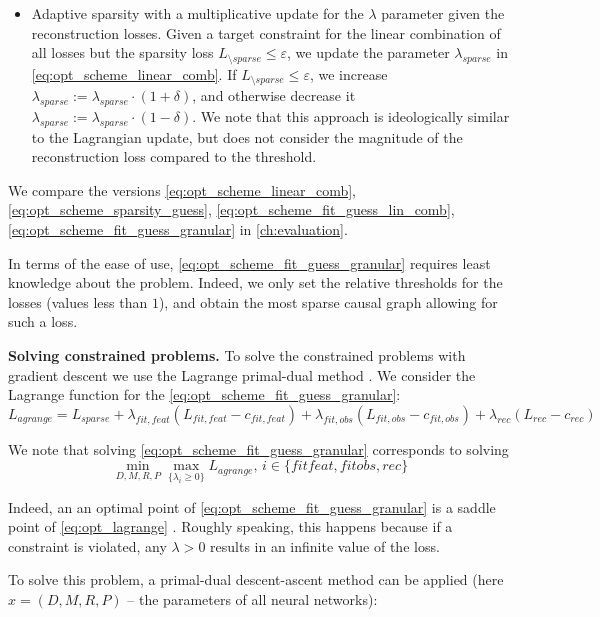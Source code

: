 \documentclass[a4paper,11pt,oneside]{report}
\begin{document}
\begin{itemize}
    \item Adaptive sparsity \cite{Dieleman2021} with a multiplicative update for the $\lambda$ parameter given the reconstruction losses. Given a target constraint for the linear combination of all losses but the sparsity loss $L_{\setminus sparse}\leq\varepsilon$, we update the parameter $\lambda_{sparse}$ in \autoref{eq:opt_scheme_linear_comb}. If $L_{\setminus sparse}\leq\varepsilon$, we increase $\lambda_{sparse}:=\lambda_{sparse}\cdot (1+\delta)$, and otherwise decrease it $\lambda_{sparse}:=\lambda_{sparse}\cdot (1-\delta)$. We note that this approach is ideologically similar to the Lagrangian update, but does not consider the magnitude of the reconstruction loss compared to the threshold.
\end{itemize}

We compare the versions \ref{eq:opt_scheme_linear_comb}, \ref{eq:opt_scheme_sparsity_guess}, \ref{eq:opt_scheme_fit_guess_lin_comb}, \ref{eq:opt_scheme_fit_guess_granular} in \autoref{ch:evaluation}.

In terms of the ease of use, \autoref{eq:opt_scheme_fit_guess_granular} requires least knowledge about the problem. Indeed, we only set the relative thresholds for the losses (values less than $1$), and obtain the most sparse causal graph allowing for such a loss.

{\bf Solving constrained problems.} To solve the constrained problems with gradient descent we use the Lagrange primal-dual method \cite{Adegbege2021}. We consider the Lagrange function for the \autoref{eq:opt_scheme_fit_guess_granular}:
$$
L_{agrange}=L_{sparse}+\lambda_{fit, feat}(L_{fit, feat}-c_{fit, feat})+\lambda_{fit, obs}(L_{fit, obs}-c_{fit, obs})+\lambda_{rec}(L_{rec}-c_{rec})
$$

We note that solving \autoref{eq:opt_scheme_fit_guess_granular} corresponds to solving
\begin{equation}
\label{eq:opt_lagrange}
\min\limits_{D,M,R,P}\max\limits_{\{\lambda_i\geq 0\}}L_{agrange},\,i\in\{fitfeat, fitobs, rec\}
\end{equation}

Indeed, an an optimal point of \autoref{eq:opt_scheme_fit_guess_granular} is a saddle point of \autoref{eq:opt_lagrange} \cite{Franceschi2019}. Roughly speaking, this happens because if a constraint is violated, any $\lambda>0$ results in an infinite value of the loss.

To solve this problem, a primal-dual descent-ascent method can be applied \cite{Franceschi2019} (here $x=(D,M,R,P)$ -- the parameters of all neural networks):
\end{document}
